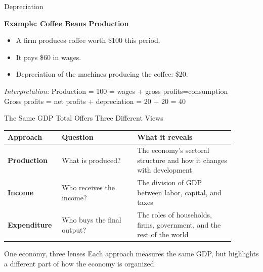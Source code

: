 \documentclass[10pt,aspectratio=169]{beamer}
\begin{document}
\begin{frame}{Depreciation}

\textbf{Example: Coffee Beans Production}

\begin{itemize}
\item A firm produces coffee worth \$100 this period.
\item It pays \$60 in wages.
\item Depreciation of the machines producing the coffee: \$20.
\end{itemize}

\begin{table}
\end{table}

\vspace{0.2cm}
\textit{Interpretation:}  
Production = 100 = wages + gross profits=consumption  \\
Gross profits = net profits + depreciation = 20 + 20 = 40  

\end{frame}




\begin{frame}{The Same GDP Total Offers Three Different Views}
\begin{center}
\renewcommand{\arraystretch}{1.45}
\begin{tabular}{@{}p{0.18\linewidth}p{0.31\linewidth}p{0.40\linewidth}@{}}
\toprule
\textbf{Approach} & \textbf{Question} & \textbf{What it reveals} \\
\midrule
\textbf{Production} & What is produced? & The economy's sectoral structure and how it changes with development \\
\textbf{Income} & Who receives the income? & The division of GDP between labor, capital, and taxes \\
\textbf{Expenditure} & Who buys the final output? & The roles of households, firms, government, and the rest of the world \\
\bottomrule
\end{tabular}
\end{center}

\medskip

\begin{block}{One economy, three lenses}
Each approach measures the same GDP, but highlights a different part of how the
economy is organized.
\end{block}
\end{frame}
\end{document}
